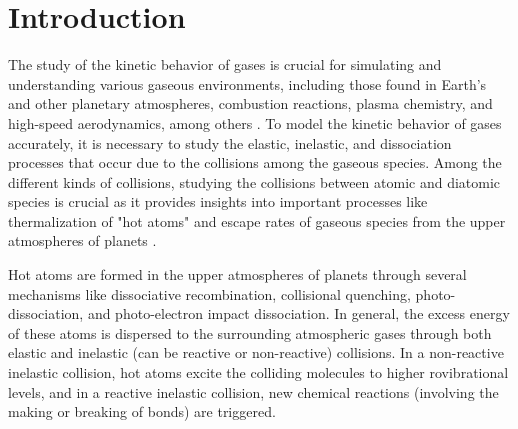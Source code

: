 \documentclass[fleqn,usenatbib]{mnras}
\begin{document}
\section{Introduction}
The study of the kinetic behavior of gases is crucial for simulating and understanding various gaseous environments, including those found in Earth's and other planetary atmospheres, combustion reactions, plasma chemistry, and high-speed aerodynamics, among others \citep{pintassilgo2016power, pavlov2011vibrationally, doi:10.1021/acs.jpca.9b05675, yankovsky2020model, keidar2015plasma}. To model the kinetic behavior of gases accurately, it is necessary to study the elastic, inelastic, and dissociation processes that occur due to the collisions among the gaseous species. \citep{https://doi.org/10.1029/2000JA000085, doi:10.1021/cr400145a,doi:10.1063/1.5058126} Among the different kinds of collisions, studying the collisions between atomic and diatomic species is crucial as it provides insights into important processes like thermalization of "hot atoms" and escape rates of gaseous species from the upper atmospheres of planets \citep{GACESA201790}.


Hot atoms are formed in the upper atmospheres of planets through several mechanisms like dissociative recombination, collisional quenching, photo-dissociation, and photo-electron impact dissociation. In general, the excess energy of these atoms is dispersed to the surrounding atmospheric gases through both elastic and inelastic (can be reactive or non-reactive) collisions. In a non-reactive inelastic collision, hot atoms excite the colliding molecules to higher rovibrational levels, and in a reactive inelastic collision, new chemical reactions (involving the making or breaking of bonds) are triggered.
\end{document}
